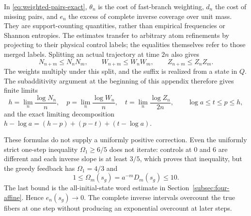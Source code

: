 \documentclass[11pt,reqno]{amsart}
\numberwithin{equation}{section}
\theoremstyle{definition}
\theoremstyle{definition}
\begin{document}
In \eqref{eq:weighted-pairs-exact}, $\theta_n$ is the cost of
fast-branch weighting, $d_n$ the cost of missing pairs, and $e_n$
the excess of complete inverse coverage over unit mass. They are
support-counting quantities, rather than empirical frequencies
or Shannon entropies. The estimates transfer to arbitrary atom
refinements by projecting to their physical control labels;
the equalities themselves refer to those merged labels.
Splitting an actual trajectory at time $2n$ also gives
\[
 N_{n+m}\le N_nN_m,\qquad W_{n+m}\le W_nW_m,
 \qquad Z_{n+m}\le Z_nZ_m.
\]
The weights multiply under this split, and the suffix is realized
from a state in $Q$. The subadditivity argument at the beginning
of this appendix therefore gives finite limits
\[
 h=\lim_n\frac{\log N_n}{n},\quad
 p=\lim_n\frac{\log W_n}{n},\quad
 t=\lim_n\frac{\log Z_n}{2n},\qquad
 \log a\le t\le p\le h,
\]
and the exact limiting decomposition
$h-\log a=(h-p)+(p-t)+(t-\log a)$.

These formulas do not supply a uniformly positive correction.
Even the uniformly strict one-step inequality
$\Omega_1\ge6/5$ does not iterate: controls at $0$ and $6$
are different and each inverse slope is at least $3/5$, which
proves that inequality, but the greedy feedback has
$\Omega_1=4/3$ and
\[
 1\le\Omega_m(s_g)=a^{-m}D_m(s_g)\le10.
\]
The last bound is the all-initial-state word estimate in
Section~\ref{subsec:four-affine}. Hence $e_n(s_g)\to0$.
The complete inverse intervals overcount the true fibers at one
step without producing an exponential overcount at later steps.
\end{document}
